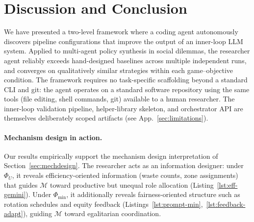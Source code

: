 \documentclass{article}
\newcommand{\cM}{\mathcal{M}}
\begin{document}
\section{Discussion and Conclusion}

We have presented a two-level framework where a coding agent autonomously discovers pipeline configurations that improve the output of an inner-loop LLM system. Applied to multi-agent policy synthesis in social dilemmas, the researcher agent reliably exceeds hand-designed baselines across multiple independent runs, and converges on qualitatively similar strategies within each game--objective condition. The framework requires no task-specific scaffolding beyond a standard CLI and git: the agent operates on a standard software repository using the same tools (file editing, shell commands, git) available to a human researcher. The inner-loop validation pipeline, helper-library skeleton, and orchestrator API are themselves deliberately scoped artifacts (see App.~\ref{sec:limitations}).

\paragraph{Mechanism design in action.}
Our results empirically support the mechanism design interpretation of Section~\ref{sec:mechdesign}. The researcher acts as an information designer: under $\Phi_U$, it reveals efficiency-oriented information (waste counts, zone assignments) that guides $\cM$ toward productive but unequal role allocation (Listing~\ref{lst:eff-gemini}). Under $\Phi_{\min}$, it additionally reveals fairness-oriented structure such as rotation schedules and equity feedback (Listings~\ref{lst:prompt-min},~\ref{lst:feedback-adapt}), guiding $\cM$ toward egalitarian coordination.

\end{document}
